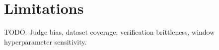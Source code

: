 \section{Limitations}

TODO: Judge bias, dataset coverage, verification brittleness, window hyperparameter sensitivity.

